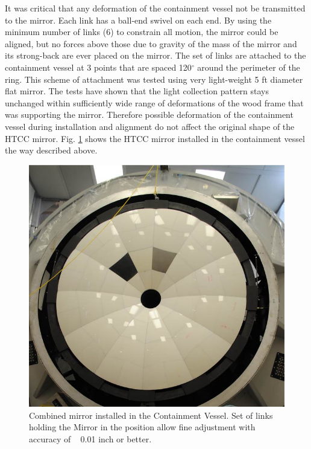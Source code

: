 It was critical that any deformation of the containment vessel not be transmitted to the mirror. Each link has a ball-end swivel on each end. By using the minimum number of links (6) to constrain all motion, the mirror could be aligned, but no forces above those due to gravity of the mass of the mirror and its strong-back are ever placed on the mirror. The set of links are attached to the containment vessel at 3 points that are spaced 120$^\circ$ around the perimeter of the ring. This scheme of attachment was tested using very light-weight 5 ft diameter flat mirror. The tests have shown that the light collection pattern stays unchanged within sufficiently wide range of deformations of the wood frame that was supporting the mirror. Therefore possible deformation of the containment vessel during installation and alignment do not affect the original shape of the HTCC mirror. Fig. \ref{fig:HTCC_MIRR_INST} shows the HTCC mirror installed in the containment vessel the way described above.

\begin{figure}[ht]
    \centering
    \includegraphics[width=1.0\linewidth,trim={0 0cm 0 0},clip]{images/HTCC_MIRR_INST.jpg}
    \caption{Combined mirror installed in the Containment Vessel. Set of links holding the Mirror in the position allow fine adjustment with accuracy of ~ 0.01 inch or better.}
    \label{fig:HTCC_MIRR_INST}
\end{figure}


